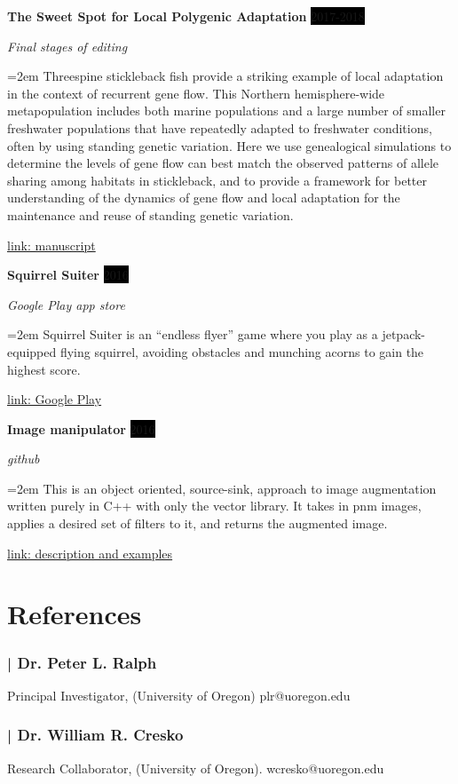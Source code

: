 \documentclass[paper=a4,fontsize=11pt]{scrartcl} %
\newcommand{\sepspace}{\vspace*{1em}}		%
\newcommand{\EducationEntry}[4]{
		\noindent \textbf{#1} \hfill      %
		\colorbox{Black}{%
			\parbox{6em}{%
			\hfill\color{White}#2}} \par  %
		\noindent \textit{#3} \par        %
		\noindent\hangindent=2em\hangafter=0 \small #4 %
		\normalsize \par}
\newcommand{\ProjectEntry}[4]{				  %
		\noindent \textbf{#1} \hfill      %
		\colorbox{Black}{\color{White}#2} \par  %
		\noindent \textit{#3} \par              %
		\noindent\hangindent=2em\hangafter=0 \small #4 %
		\normalsize \par}
\begin{document}
\ProjectEntry{The Sweet Spot for Local Polygenic Adaptation}{2017-2018}{Final stages of editing}
{Threespine stickleback fish provide a striking example of local adaptation in the context of recurrent gene flow. 
This Northern hemisphere-wide metapopulation includes both marine populations and a large number of smaller freshwater populations that have repeatedly adapted to freshwater conditions, often by using standing genetic variation. 
Here we use genealogical simulations to determine the levels of gene flow can best match the observed patterns of allele sharing among habitats in stickleback, 
and to provide a framework for better understanding of the dynamics of gene flow and local adaptation for the maintenance and reuse of standing genetic variation.

}
\href{https://github.com/jgallowa07/SticklebackPaper/blob/master/Stickleback_Paper.pdf}{link: manuscript}
\sepspace

\ProjectEntry{Squirrel Suiter}{2016}{Google Play app store}
{Squirrel Suiter is an ``endless flyer'' game where you play as a jetpack-equipped flying squirrel,
 avoiding obstacles and munching acorns to gain the highest score. }
\href{https://play.google.com/store/apps/details?id=com.Nighthawks.SquirrelSuiter}{link: Google Play}
\sepspace

\ProjectEntry{Image manipulator}{2016}{github}
{This is an object oriented, source-sink, approach to image augmentation written purely in C++ with only the vector library.
It takes in pnm images, applies a desired set of filters to it, and returns the augmented image. 
}
\href{https://jaredgalloway.org/Image-Manipulator}{link: description and examples}
\sepspace


\section*{References}

\subsubsection*{| Dr. Peter L. Ralph} 
\begin{center}
Principal Investigator, (University of Oregon) 
plr@uoregon.edu
\end{center}

\subsubsection*{| Dr. William R. Cresko}  
\begin{center}
Research Collaborator, (University of Oregon).
wcresko@uoregon.edu
\end{center}
\end{document}
